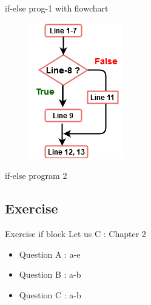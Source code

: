\documentclass[10pt,a4paper]{beamer}
\begin{document}
    \begin{frame}{if-else prog-1 with flowchart}
        \begin{minipage}{0.7 \linewidth}
            
        \end{minipage}%
        \begin{minipage}{0.3 \linewidth}
            \begin{figure}
            	    \centering
            	    \includegraphics[height=5 cm, width=4 cm]{images/if-else-block-prg-1-flowchart.png}
        	\end{figure}
        \end{minipage}
        
    \end{frame}
    
    \begin{frame}{if-else program 2}
         
    \end{frame}
\subsection{Exercise}
    \begin{frame}{Exercise if block}
        Let us C : Chapter 2
        \begin{itemize}
            \item[1.] Question A : a-e
            \item[2.] Question B : a-b
            \item[3.] Question C : a-b
            
        \end{itemize}
        
    \end{frame}
\end{document}
